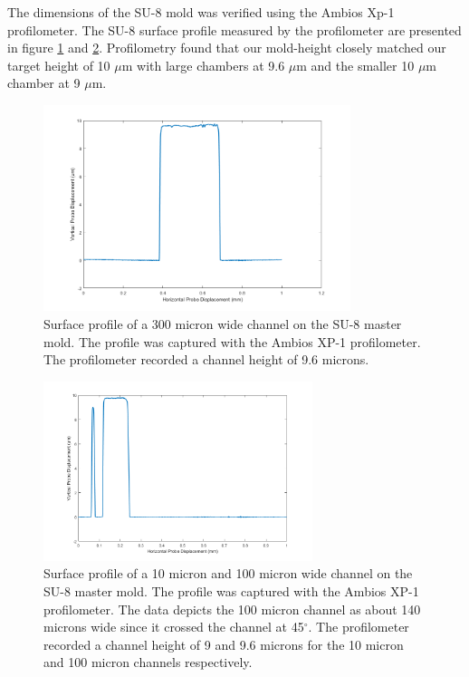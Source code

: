 \par The dimensions of the SU-8 mold was verified using the Ambios Xp-1 profilometer. The SU-8 surface profile measured by the profilometer are presented in figure \ref{fig:profilometer_300um_channel} and \ref{fig:profilometer_10um_channel_100um_sideways}. Profilometry found that our mold-height closely matched our target height of 10 $\mu$m with large chambers at 9.6 $\mu$m and the smaller 10 $\mu$m chamber at 9 $\mu$m.


\begin{figure}[H]
    \centering
    \includegraphics[width=0.8\textwidth]{images/300umWideChannel.png}
    \caption[Surface profile of a 300 micron wide channel on the SU-8 master mold.]{Surface profile of a 300 micron wide channel on the SU-8 master mold. The profile was captured with the Ambios XP-1 profilometer. The profilometer recorded a channel height of 9.6 microns.}
    \label{fig:profilometer_300um_channel}
\end{figure}

\begin{figure}[h]
    \centering
    \includegraphics[width=0.7\textwidth]{images/10umWideAndSidewaysThrough100umWide.png}
    \caption[Surface profile of a 10 micron and 100 micron wide channel on the SU-8 master mold.]{Surface profile of a 10 micron and 100 micron wide channel on the SU-8 master mold. The profile was captured with the Ambios XP-1 profilometer. The data depicts the 100 micron channel as about 140 microns wide since it crossed the channel at 45$^\circ$. The profilometer recorded a channel height of 9 and 9.6 microns for the 10 micron and 100 micron channels respectively.}
    \label{fig:profilometer_10um_channel_100um_sideways}
\end{figure}

